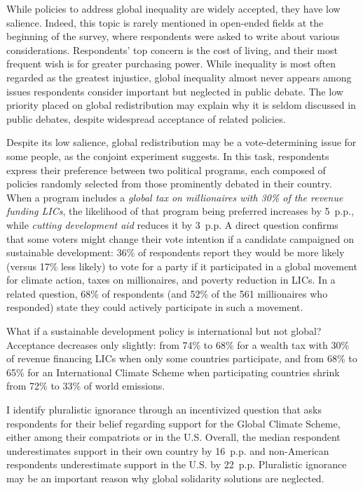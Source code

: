 \documentclass[12pt,english]{article}
\begin{document}
\begin{bibunit}
While policies to address global inequality are widely accepted, they have low salience. Indeed, this topic is rarely mentioned in open-ended fields at the beginning of the survey, where respondents were asked to write about various considerations. Respondents' top concern is the cost of living, and their most frequent wish is for greater purchasing power. While inequality is most often regarded as the greatest injustice, %
global inequality almost never appears among issues respondents consider important but neglected in public debate. The low priority placed on global redistribution may explain why it is seldom discussed in public debates, despite widespread acceptance of related policies.

Despite its low salience, global redistribution may be a vote-determining issue for some people, as the conjoint experiment suggests. In this task, respondents express their preference between two political programs, each composed of policies randomly selected from those prominently debated in their country. When a program includes a \textit{global tax on millionaires with 30\% of the revenue funding LICs}, the likelihood of that program being preferred increases by 5~p.p., while \textit{cutting development aid} reduces it by 3~p.p. A direct question confirms that some voters might change their vote intention if a candidate campaigned on sustainable development: 36\% of respondents report they would be more likely (versus 17\% less likely) to vote for a party if it participated in a global movement for climate action, taxes on millionaires, and poverty reduction in LICs. In a related question, 68\% of respondents (and 52\% of the 561 millionaires who responded) state they could actively participate in such a movement. %

What if a sustainable development policy is international but not global? Acceptance decreases only slightly: from 74\% to 68\% for a wealth tax with 30\% of revenue financing LICs when only some countries participate, and from 68\% to 65\% for an International Climate Scheme when participating countries shrink from 72\% to 33\% of world emissions.

I identify pluralistic ignorance through an incentivized question that asks respondents for their belief regarding support for the Global Climate Scheme, either among their compatriots or in the U.S. %
Overall, the median respondent underestimates support in their own country by 16~p.p. and non-American respondents underestimate support in the U.S. by 22~p.p. Pluralistic ignorance may be an important reason why global solidarity solutions are neglected.


\end{bibunit}
\end{document}
